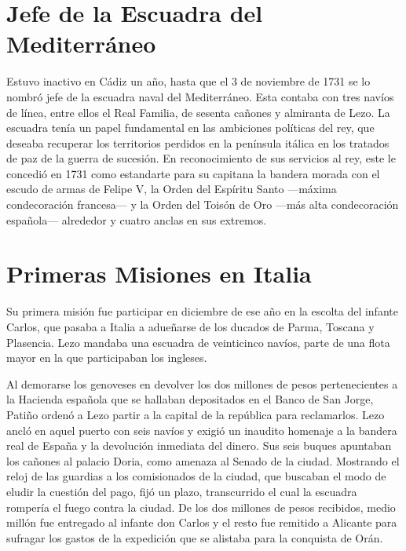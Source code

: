 
\section{Jefe de la Escuadra del Mediterráneo}

Estuvo inactivo en Cádiz un año, hasta que el 3 de noviembre de 1731
se lo nombró jefe de la escuadra naval del Mediterráneo. Esta contaba
con tres navíos de línea, entre ellos el Real Familia, de sesenta
cañones y almiranta de Lezo. La escuadra tenía un papel fundamental en
las ambiciones políticas del rey, que deseaba recuperar los
territorios perdidos en la península itálica en los
tratados de paz de la guerra de sucesión. En
reconocimiento de sus servicios al rey, este le concedió en 1731 como
estandarte para su capitana la bandera morada con el escudo de armas
de Felipe V, la Orden del Espíritu Santo ---máxima condecoración
francesa--- y la Orden del Toisón de Oro ---más alta condecoración
española--- alrededor y cuatro anclas en sus extremos.

\section{Primeras Misiones en Italia}

Su primera misión fue participar en diciembre de ese año en la escolta
del infante Carlos, que pasaba a Italia a adueñarse de los ducados de
Parma, Toscana y Plasencia. Lezo mandaba una escuadra de veinticinco
navíos, parte de una flota mayor en la que participaban los ingleses.

Al demorarse los genoveses en devolver los dos millones de pesos
pertenecientes a la Hacienda española que se hallaban depositados en
el Banco de San Jorge, Patiño ordenó a Lezo partir a la capital de la
república para reclamarlos. Lezo ancló en aquel puerto con seis navíos
y exigió un inaudito homenaje a la bandera real de España y la
devolución inmediata del dinero. Sus seis buques apuntaban los cañones
al palacio Doria, como amenaza al Senado de la ciudad.  Mostrando el
reloj de las guardias a los comisionados de la ciudad, que buscaban el
modo de eludir la cuestión del pago, fijó un plazo, transcurrido el
cual la escuadra rompería el fuego contra la ciudad.  De los dos
millones de pesos recibidos, medio millón fue entregado al infante don
Carlos y el resto fue remitido a Alicante para sufragar los gastos de
la expedición que se alistaba para la conquista de Orán.

